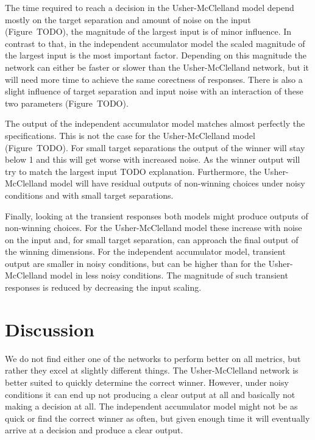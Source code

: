\documentclass[10pt,letterpaper]{article}
\begin{document}
The time required to reach a decision in the Usher-McClelland model depend 
mostly on the target separation and amount of noise on the input (Figure~TODO), 
the magnitude of the largest input is of minor influence. In contrast to that, 
in the independent accumulator model the scaled magnitude of the largest input 
is the most important factor. Depending on this magnitude the network can either 
be faster or slower than the Usher-McClelland network, but it will need more 
time to achieve the same corectness of responses. There is also a slight 
influence of target separation and input noise with an interaction of these two 
parameters (Figure~TODO).

The output of the independent accumulator model matches almost perfectly the 
specifications. This is not the case for the Usher-McClelland model 
(Figure~TODO).  For small target separations the output of the winner will stay 
below 1 and this will get worse with increased noise. As the winner output will 
try to match the largest input TODO explanation. Furthermore, the 
Usher-McClelland model will have residual outputs of non-winning choices under 
noisy conditions and with small target separations.

Finally, looking at the transient responses both models might produce outputs of 
non-winning choices. For the Usher-McClelland model these increase with noise on 
the input and, for small target separation, can approach the final output of the 
winning dimensions. For the independent accumulator model, transient output are 
smaller in noisy conditions, but can be higher than for the Usher-McClelland 
model in less noisy conditions. The magnitude of such transient responses is 
reduced by decreasing the input scaling.

\section{Discussion}
We do not find either one of the networks to perform better on all metrics, but 
rather they excel at slightly different things. The Usher-McClelland network is 
better suited to quickly determine the correct winner. However, under noisy 
conditions it can end up not producing a clear output at all and basically not 
making a decision at all. The independent accumulator model might not be as 
quick or find the correct winner as often, but given enough time it will 
eventually arrive at a decision and produce a clear output.
\end{document}
